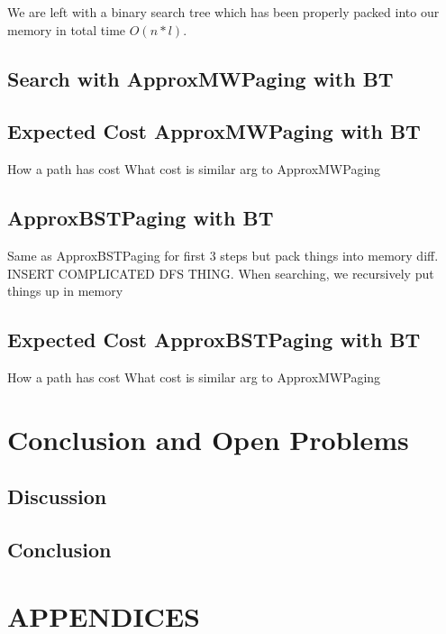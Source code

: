 \documentclass[letterpaper,12pt,titlepage,oneside,final]{book}
\theoremstyle{plain}
\begin{document}
We are left with a binary search tree which has been properly packed into our memory in total time $O(n * l)$.

\section{Search with ApproxMWPaging with BT}




\section{Expected Cost ApproxMWPaging with BT}

How a path has cost
What cost is
similar arg to ApproxMWPaging


\section{ApproxBSTPaging with BT}
Same as ApproxBSTPaging for first 3 steps but pack things into memory diff. INSERT COMPLICATED DFS THING.
When searching, we recursively put things up in memory


\section{Expected Cost ApproxBSTPaging with BT}
How a path has cost
What cost is
similar arg to ApproxMWPaging

\chapter{Conclusion and Open Problems}

\section{Discussion}

\section{Conclusion}



\appendix

\chapter*{APPENDICES}
\end{document}
